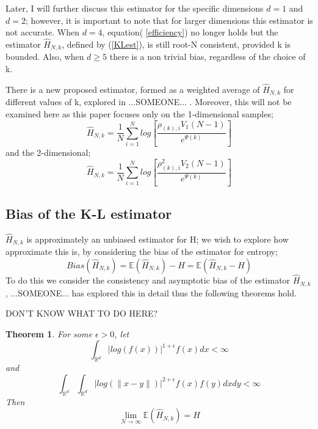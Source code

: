 \documentclass{article}
\newtheorem{theorem}{Theorem}
\begin{document}
Later, I will further discuss this estimator for the specific dimensions $d=1$ and $d=2$; however, it is important to note that for larger dimensions this estimator is not accurate. When $d=4$, equation( \ref{efficiency}) no longer holds but the estimator $\hat{H}_{N, k}$, defined by (\ref{KLest}), is still root-N consistent, provided k is bounded. Also, when $d \geq 5$ there is a non trivial bias, regardless of the choice of k. 

There is a new proposed estimator, formed as a weighted average of $\hat{H}_{N, k}$ for different values of k, explored in ...SOMEONE... . Moreover, this will not be examined here as this paper focuses only on the 1-dimensional samples;
\begin{equation} \label{KLestd=1}
\hat{H}_{N, k} = \frac{1}{N} \sum_{i=1}^{N} log \left[ \frac{\rho_{(k),i} V_{1} (N-1)}{e^{\Psi(k)}} \right]
\end{equation}
and the 2-dimensional;
\begin{equation} \label{KLestd=2}
\hat{H}_{N, k} = \frac{1}{N} \sum_{i=1}^{N} log \left[ \frac{\rho_{(k),i}^{2} V_{2} (N-1)}{e^{\Psi(k)}} \right]
\end{equation}



\subsection{Bias of the K-L estimator}
$\hat{H}_{N, k}$ is approximately an unbiased estimator for H; we wish to explore how approximate this is, by considering the bias of the estimator for entropy;
\begin{equation} \label{Bias}
Bias(\hat{H}_{N, k} ) = \mathbb{E}(\hat{H}_{N, k}) - H = \mathbb{E}(\hat{H}_{N, k} - H)
\end{equation}
To do this we consider the consistency and asymptotic bias of the estimator $\hat{H}_{N, k}$, ...SOMEONE... has explored this in detail thus the following theorems hold.

DON'T KNOW WHAT TO DO HERE?

\begin{theorem} \label{Paper1Thm1}
For some $\epsilon > 0$, let
\begin{equation}
\int_{\mathbb{R}^{d}} | log(f(x))|^{1 + \epsilon} f(x) dx < \infty
\end{equation}
and
\begin{equation}
\int_{\mathbb{R}^{d}} \int_{\mathbb{R}^{d}} | log(\|x-y\|)|^{2+ \epsilon} f(x) f(y) dx dy < \infty
\end{equation}
Then
\begin{equation}
\lim_{N \to \infty} \mathbb{E} (\hat{H}_{N, k}) = H
\end{equation}
\end{theorem}
\end{document}
